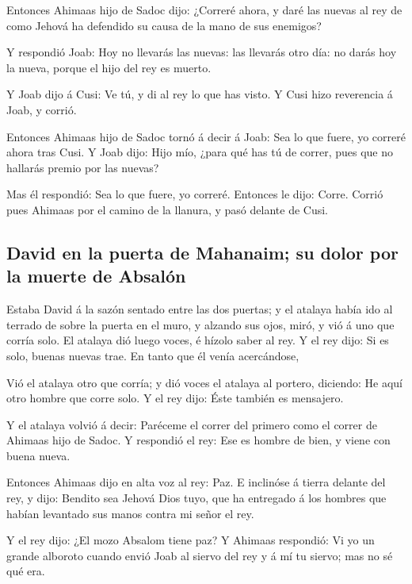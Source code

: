  Entonces Ahimaas hijo de Sadoc dijo: ¿Correré ahora, y
daré las nuevas al rey de como Jehová ha defendido su causa de la mano
de sus enemigos?

 Y respondió Joab: Hoy no llevarás las nuevas: las
llevarás otro día: no darás hoy la nueva, porque el hijo del rey es
muerto.

 Y Joab dijo á Cusi: Ve tú, y di al rey lo que has visto.
Y Cusi hizo reverencia á Joab, y corrió.

 Entonces Ahimaas hijo de Sadoc tornó á decir á Joab: Sea
lo que fuere, yo correré ahora tras Cusi. Y Joab dijo: Hijo mío, ¿para
qué has tú de correr, pues que no hallarás premio por las nuevas?

 Mas él respondió: Sea lo que fuere, yo correré. Entonces
le dijo: Corre. Corrió pues Ahimaas por el camino de la llanura, y pasó
delante de Cusi.

\hypertarget{david-en-la-puerta-de-mahanaim-su-dolor-por-la-muerte-de-absaluxf3n}{%
\subsection{David en la puerta de Mahanaim; su dolor por la muerte de
Absalón}\label{david-en-la-puerta-de-mahanaim-su-dolor-por-la-muerte-de-absaluxf3n}}

 Estaba David á la sazón sentado entre las dos puertas; y
el atalaya había ido al terrado de sobre la puerta en el muro, y alzando
sus ojos, miró, y vió á uno que corría solo.  El atalaya
dió luego voces, é hízolo saber al rey. Y el rey dijo: Si es solo,
buenas nuevas trae. En tanto que él venía acercándose,

 Vió el atalaya otro que corría; y dió voces el atalaya
al portero, diciendo: He aquí otro hombre que corre solo. Y el rey dijo:
Éste también es mensajero.

 Y el atalaya volvió á decir: Paréceme el correr del
primero como el correr de Ahimaas hijo de Sadoc. Y respondió el rey: Ese
es hombre de bien, y viene con buena nueva.

 Entonces Ahimaas dijo en alta voz al rey: Paz. E
inclinóse á tierra delante del rey, y dijo: Bendito sea Jehová Dios
tuyo, que ha entregado á los hombres que habían levantado sus manos
contra mi señor el rey.

 Y el rey dijo: ¿El mozo Absalom tiene paz? Y Ahimaas
respondió: Vi yo un grande alboroto cuando envió Joab al siervo del rey
y á mí tu siervo; mas no sé qué era.

